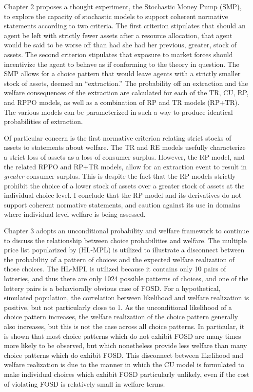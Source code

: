 \documentclass[../main.tex]{subfiles}
\begin{document}
Chapter 2 proposes a thought experiment, the Stochastic Money Pump (SMP), to explore the capacity of stochastic models to support coherent normative statements according to two criteria.
The first criterion stipulates that should an agent be left with strictly fewer assets after a resource allocation, that agent would be said to be worse off than had she had her previous, greater, stock of assets.
The second criterion stipulates that exposure to market forces should incentivize the agent to behave as if conforming to the theory in question.
The SMP allows for a choice pattern that would leave agents with a strictly smaller stock of assets, deemed an \enquote{extraction.}
The probability off an extraction and the welfare consequences of the extraction are calculated for each of the TR, CU, RP, and RPPO models, as well as a combination of RP and TR models (RP+TR).
The various models can be parameterized in such a way to produce identical probabilities of extraction.

Of particular concern is the first normative criterion relating strict stocks of assets to statements about welfare.
The TR and RE models usefully characterize a strict loss of assets as a loss of consumer surplus.
However, the RP model, and the related RPPO and RP+TR models, allow for an extraction event to result in \textit{greater} consumer surplus.
This is despite the fact that the RP models strictly prohibit the choice of a lower stock of assets over a greater stock of assets at the individual choice level.
I conclude that the RP model and its derivatives do not support coherent normative statements, and caution against its use in domains where individual level welfare is being assessed.

Chapter 3 adopts an unconditional probability and welfare framework to continue to discuss the relationship between choice probabilities and welfare.
The multiple price list popularized by \textcite{Holt2002} (HL-MPL) is utilized to illustrate a disconnect between the probability of a pattern of choices and the expected welfare realization of those choices.
The HL-MPL is utilized because it contains only 10 pairs of lotteries, and thus there are only 1024 possible patterns of choices, and one of the lottery pairs is a behaviorally obvious case of FOSD.
For a hypothetical, simulated population, the correlation between likelihood and welfare realization is positive, but not particularly close to 1.
As the unconditional likelihood of a choice pattern increases, the welfare realization of the choice pattern generally also increases, but this is not the case across all choice patterns.
In particular, it is shown that most choice patterns which do not exhibit FOSD are many times more likely to be observed, but which nonetheless provide less welfare than many choice patterns which do exhibit FOSD.
This disconnect between likelihood and welfare realization is due to the manner in which the CU model is formulated to make individual choices which exhibit FOSD particularly unlikely, even if the cost of violating FOSD is relatively small in welfare terms.
\end{document}
